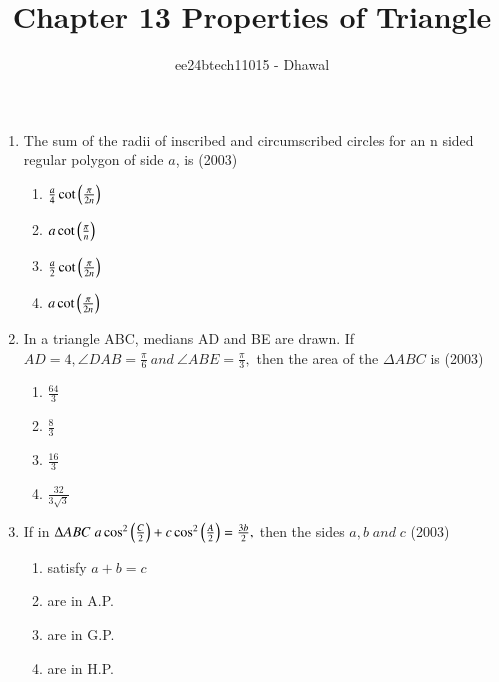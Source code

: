 \documentclass[journal,12pt,twocolumn]{IEEEtran}
\theoremstyle{remark}
\begin{document}

\vspace{3cm}

\title{Chapter 13 Properties of Triangle}
\author{ee24btech11015 - Dhawal}
\maketitle
\newpage
\bigskip

\renewcommand{\thefigure}{\theenumi}
\renewcommand{\thetable}{\theenumi}

\begin{enumerate}[start =3]
        
    \item The sum of the radii of inscribed and circumscribed circles for an n sided regular polygon of side $a$, is  \hfill{(2003)}
\begin{multicols}{2}
\begin{enumerate}
        \item $\frac{a}{4} \cot{\ensuremath{\left(\frac{\pi}{2n}\right)}}$                    
        \item $ a \cot{\ensuremath{\left(\frac{\pi}{n}\right)}}$ 
        \item $\frac{a}{2} \cot{\ensuremath{\left(\frac{\pi}{2n}\right)}}$ 
        \item $ a \cot{\ensuremath{\left(\frac{\pi}{2n}\right)}}$
\end{enumerate}
\end{multicols}

\item In a triangle ABC, medians AD and BE are drawn. If $AD=4, \angle{DAB}=\frac{\pi}{6}\:and\:\angle{ABE}=\frac{\pi}{3},$ then the area of the $\Delta{ABC}$ is \hfill{(2003)}
\begin{multicols}{4}
\begin{enumerate}
        \item $\frac{64}{3}$                    
        \item $\frac{8}{3}$ 
        \item $\frac{16}{3}$ 
        \item $\frac{32}{3\sqrt{3}}$
\end{enumerate}
\end{multicols} 

\item If in $\Delta{ABC}\;a\cos^2\left(\frac{C}{2}\right) + c\cos^2\left(\frac{A}{2}\right) = \frac{3b}{2},$ then the sides $a,b\;and\;c$ \hfill{(2003)}
\begin{multicols}{2}
\begin{enumerate}
        \item satisfy $a+b=c$                    
        \item are in A.P. 
        \item are in G.P. 
        \item are in H.P.
\end{enumerate}
\end{multicols} 


\end{enumerate}
\end{document}
